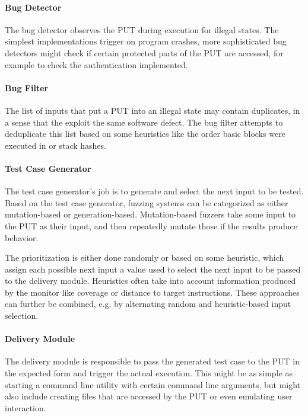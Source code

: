 \documentclass{article}
\begin{document}
\begin{multicols}{2}
    \paragraph{Bug Detector}
    The bug detector observes the PUT during execution for illegal states. The simplest implementations trigger on program crashes, more sophisticated bug detectors might check if certain protected parts of the PUT are accessed, for example to check the authentication implemented.

    \paragraph{Bug Filter}
    The list of inputs that put a PUT into an illegal state may contain duplicates, in a sense that the exploit the same software defect. The bug filter attempts to deduplicate this list based on some heuristics like the order basic blocks were executed in or stack hashes.

    \paragraph{Test Case Generator}
    The test case generator's job is to generate and select the next input to be tested. Based on the test case generator, fuzzing systems can be categorized as either mutation-based or generation-based. Mutation-based fuzzers take some input to the PUT as their input, and then repeatedly mutate those if the results produce  behavior\cite{EvaluatingFuzzTesting}.

    The prioritization is either done randomly or based on some heuristic, which assign each possible next input a value used to select the next input to be passed to the delivery module. Heuristics often take into account information produced by the monitor like coverage or distance to target instructions. These approaches can further be combined, e.g. by alternating random and heuristic-based input selection.

    \paragraph{Delivery Module}
    The delivery module is responsible to pass the generated test case to the PUT in the expected form and trigger the actual execution. This might be as simple as starting a command line utility with certain command line arguments, but might also include creating files that are accessed by the PUT or even emulating user interaction.


\end{multicols}
\end{document}
